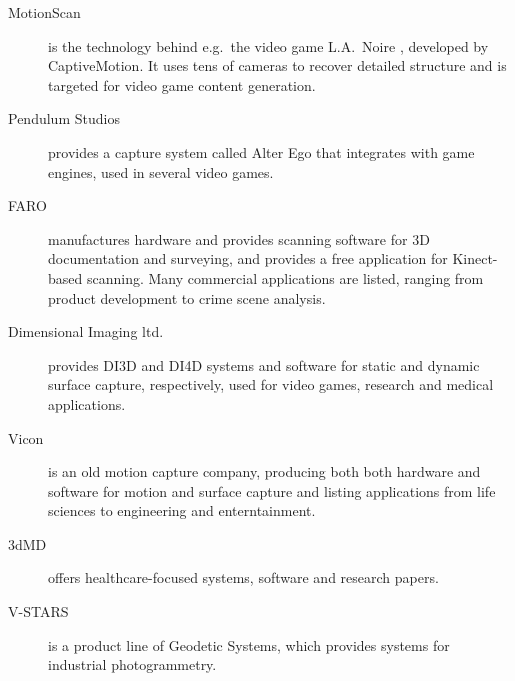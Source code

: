 \begin{description}
	\item[MotionScan] is the technology behind e.g.\ the video game L.A.\ Noire \cite{rockstar2011noire}, developed by CaptiveMotion. It uses tens of cameras to recover detailed structure and is targeted for video game content generation.
	\item[Pendulum Studios] provides a capture system called Alter Ego that integrates with game engines, used in several video games. \cite{alterego}
	\item [FARO] manufactures hardware and provides scanning software for 3D documentation and surveying, and provides a free application for Kinect-based scanning. Many commercial applications are listed, ranging from product development to crime scene analysis. \cite{faro}
	\item[Dimensional Imaging ltd.] provides DI3D and DI4D systems and software for static and dynamic surface capture, respectively, used for video games, research and medical applications. \cite{di4d}
	\item[Vicon] is an old motion capture company, producing both both hardware and software for motion and surface capture and listing applications from life sciences to engineering and enterntainment. \cite{vicon}
	\item[3dMD] offers healthcare-focused systems, software and research papers. \cite{3dmd}
	\item[V-STARS] is a product line of Geodetic Systems, which provides systems for industrial photogrammetry. \cite{vstars}
\end{description}
